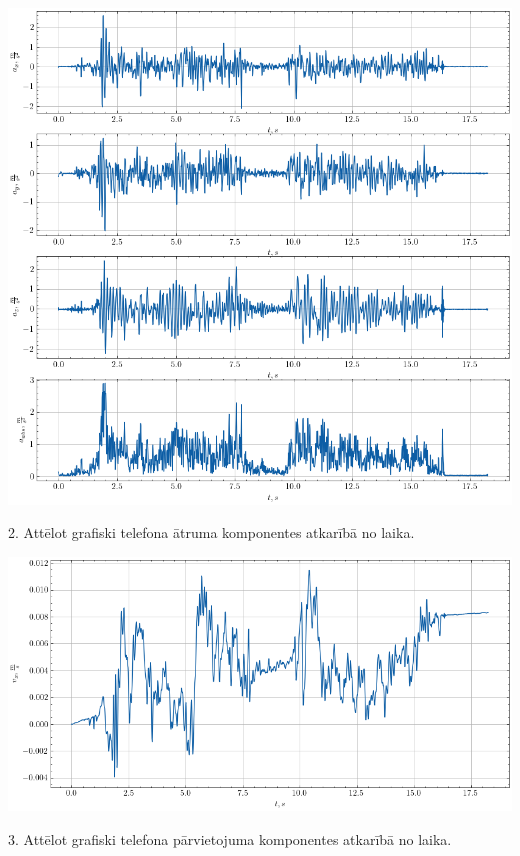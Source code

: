 \documentclass[12pt]{article}
\begin{document}
\begin{center}
    \includegraphics[width=1\textwidth]{Telefona pārvietojuma noteikšana1.png}
\end{center}

2.	Attēlot grafiski telefona ātruma komponentes atkarībā no laika.

\begin{center}
    \includegraphics[width=1\textwidth]{Telefona pārvietojuma noteikšana2.png}
\end{center}

3.	Attēlot grafiski telefona pārvietojuma komponentes atkarībā no laika.
\end{document}
